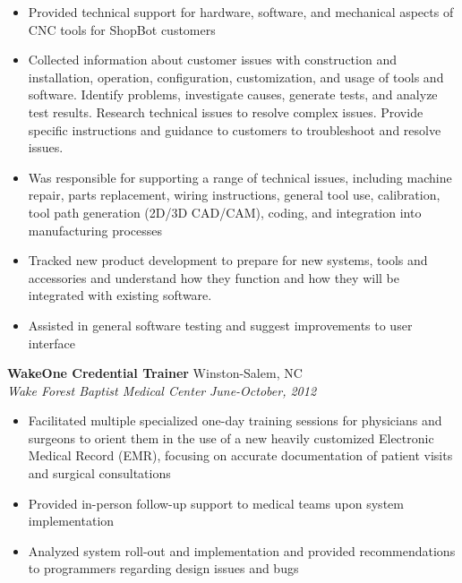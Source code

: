 \documentclass[10pt]{article}
\begin{document}
\begin{itemize}
\setlength{\itemsep}{0pt}

\item Provided technical support for hardware, software, and mechanical
aspects of CNC tools for ShopBot customers

\item Collected information about customer issues with construction and
installation, operation, configuration, customization, and usage of tools
and software. Identify problems, investigate causes, generate tests,
and analyze test results. Research technical issues to resolve complex
issues. Provide specific instructions and guidance to customers to
troubleshoot and resolve issues.

\item Was responsible for supporting a range of technical issues, including
machine repair, parts replacement, wiring instructions, general tool use,
calibration, tool path generation (2D/3D CAD/CAM), coding, and integration
into manufacturing processes

\item Tracked new product development to prepare for new systems, tools and
accessories and understand how they function and how they will be integrated
with existing software.

\item Assisted in general software testing and suggest improvements to user
interface

\end{itemize}

\noindent
{\bf WakeOne Credential Trainer} \hfill Winston-Salem, NC\\
{\it Wake Forest Baptist Medical Center} \hfill {\it June-October, 2012}

\begin{itemize}
\setlength{\itemsep}{0pt}

\item Facilitated multiple specialized one-day training sessions for physicians
and surgeons to orient them in the use of a new heavily customized Electronic
Medical Record (EMR), focusing on accurate documentation of patient visits
and surgical consultations

\item Provided in-person follow-up support to medical teams upon system
implementation

\item Analyzed system roll-out and implementation and provided
recommendations to programmers regarding design issues and bugs

\end{itemize}
\end{document}
